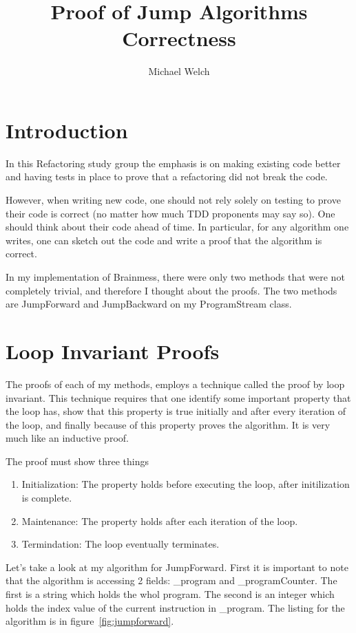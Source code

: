 \documentclass[10pt]{article}
\begin{document}
\title{Proof of Jump Algorithms Correctness}
\author{Michael Welch}
\maketitle

\section*{Introduction}
In this Refactoring study group the emphasis is on making existing code
better and having tests in place to prove that a refactoring did not
break the code.

However, when writing new code, one should not rely solely on testing
to prove their code is correct (no matter how much TDD proponents may say
so). One should think about their code ahead of time. In particular,
for any algorithm one writes, one can sketch out
the code and write a proof that the algorithm is correct.

In my implementation of Brainmess, there were only two methods that
were not completely trivial, and therefore I thought about the proofs.
The two methods are JumpForward and JumpBackward on my ProgramStream
class.

\section*{Loop Invariant Proofs}
The proofs of each of my methods, employs a technique called the
proof by loop invariant. This technique requires that one
identify some important property that the loop has, show that this
property is true initially and after every iteration of the loop,
and finally because of this property proves the algorithm. It is very
much like an inductive proof.

The proof must show three things

\begin{enumerate}
\item Initialization: The property holds before executing the loop, after initilization is complete.

\item Maintenance: The property holds after each iteration of the loop.

\item Termindation: The loop eventually terminates.
\end{enumerate}

Let's take a look at my algorithm for JumpForward. First it is important
to note that the algorithm is accessing 2 fields: \_program and 
\_programCounter. The first is a string which holds the whol program.
The second is an integer which holds the index value of the current
instruction in \_program. The listing for the algorithm is in
figure~\ref{fig:jumpforward}.
\end{document}
